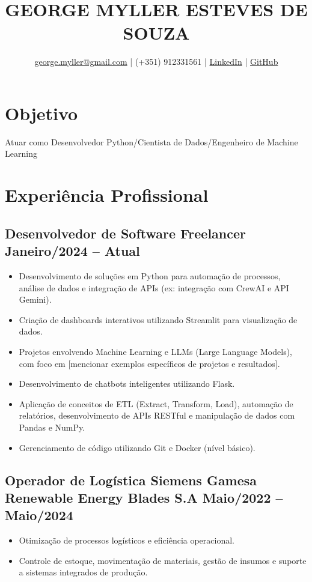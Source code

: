 \documentclass{article}
\title{GEORGE MYLLER ESTEVES DE SOUZA}
\author{\href{mailto:george.myller@gmail.com}{george.myller@gmail.com} | (+351) 912331561 | \href{https://linkedin.com/in/george-m-souza}{LinkedIn} | \href{https://github.com/GeorgeMyller}{GitHub}}
\date{}
\begin{document}
\maketitle

\section*{Objetivo}
 Atuar como Desenvolvedor Python/Cientista de Dados/Engenheiro de Machine Learning

\section*{Experiência Profissional}

\subsection*{Desenvolvedor de Software \newline Freelancer \newline Janeiro/2024 – Atual}
\begin{itemize}
    \item Desenvolvimento de soluções em Python para automação de processos, análise de dados e integração de APIs (ex: integração com CrewAI e API Gemini).
    \item Criação de dashboards interativos utilizando Streamlit para visualização de dados.
    \item Projetos envolvendo Machine Learning e LLMs (Large Language Models), com foco em [mencionar exemplos específicos de projetos e resultados].
    \item Desenvolvimento de chatbots inteligentes utilizando Flask.
    \item Aplicação de conceitos de ETL (Extract, Transform, Load), automação de relatórios, desenvolvimento de APIs RESTful e manipulação de dados com Pandas e NumPy.
    \item Gerenciamento de código utilizando Git e Docker (nível básico).
\end{itemize}

\subsection*{Operador de Logística \newline Siemens Gamesa Renewable Energy Blades S.A \newline Maio/2022 – Maio/2024}
\begin{itemize}
    \item Otimização de processos logísticos e eficiência operacional.
    \item Controle de estoque, movimentação de materiais, gestão de insumos e suporte a sistemas integrados de produção.
\end{itemize}
\end{document}
